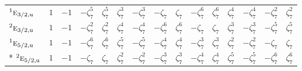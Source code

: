 \documentclass[10pt,a4paper]{article}
\numberwithin{equation}{section}
\newcommand{\irr}[1]{\text{\normalfont\scshape #1}}
\newcommand{\conjpair}[1]{{}^{#1}}
\newcommand{\ptag}[1]{\mathrm{#1}}
\newcommand{\rootunity}[1]{\zeta_{#1}}
\begin{document}
{\begin{longtable}{@{}lcccccccccccccc@{}}
$\conjpair{1}\irr{e}_{3/2,\ptag{u}}$ & $1$ & $-1$ & $-\rootunity{7}^{5}$ & $\rootunity{7}^{5}$ & $\rootunity{7}^{3}$ & $-\rootunity{7}^{3}$ & $-\rootunity{7}$ & $\rootunity{7}$ & $-\rootunity{7}^{6}$ & $\rootunity{7}^{6}$ & $\rootunity{7}^{4}$ & $-\rootunity{7}^{4}$ & $-\rootunity{7}^{2}$ & $\rootunity{7}^{2}$\\
$\conjpair{2}\irr{e}_{3/2,\ptag{u}}$ & $1$ & $-1$ & $-\rootunity{7}^{2}$ & $\rootunity{7}^{2}$ & $\rootunity{7}^{4}$ & $-\rootunity{7}^{4}$ & $-\rootunity{7}^{6}$ & $\rootunity{7}^{6}$ & $-\rootunity{7}$ & $\rootunity{7}$ & $\rootunity{7}^{3}$ & $-\rootunity{7}^{3}$ & $-\rootunity{7}^{5}$ & $\rootunity{7}^{5}$\\
$\conjpair{1}\irr{e}_{5/2,\ptag{u}}$ & $1$ & $-1$ & $-\rootunity{7}^{6}$ & $\rootunity{7}^{6}$ & $\rootunity{7}^{5}$ & $-\rootunity{7}^{5}$ & $-\rootunity{7}^{4}$ & $\rootunity{7}^{4}$ & $-\rootunity{7}^{3}$ & $\rootunity{7}^{3}$ & $\rootunity{7}^{2}$ & $-\rootunity{7}^{2}$ & $-\rootunity{7}$ & $\rootunity{7}$\\*
$\conjpair{2}\irr{e}_{5/2,\ptag{u}}$ & $1$ & $-1$ & $-\rootunity{7}$ & $\rootunity{7}$ & $\rootunity{7}^{2}$ & $-\rootunity{7}^{2}$ & $-\rootunity{7}^{3}$ & $\rootunity{7}^{3}$ & $-\rootunity{7}^{4}$ & $\rootunity{7}^{4}$ & $\rootunity{7}^{5}$ & $-\rootunity{7}^{5}$ & $-\rootunity{7}^{6}$ & $\rootunity{7}^{6}$\\
\bottomrule\end{longtable}}
\end{document}
